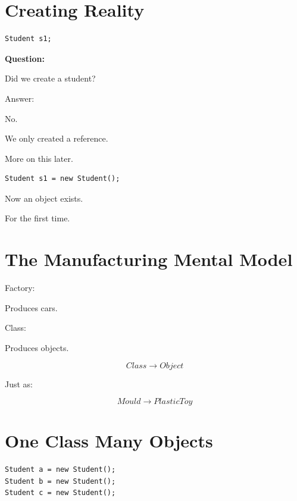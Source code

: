 \documentclass[11pt,a4paper]{book}
\begin{document}

\section{Creating Reality}

\begin{verbatim}
Student s1;
\end{verbatim}

\textbf{Question:}

Did we create a student?

Answer:

No.

We only created a reference.

More on this later.


\begin{verbatim}
Student s1 = new Student();
\end{verbatim}

Now an object exists.

For the first time.


\section{The Manufacturing Mental Model}

\begin{mentalmodel}

Factory:

Produces cars.

Class:

Produces objects.

\end{mentalmodel}

\[
Class
\rightarrow
Object
\]

Just as:

\[
Mould
\rightarrow
Plastic Toy
\]


\section{One Class Many Objects}

\begin{verbatim}
Student a = new Student();
Student b = new Student();
Student c = new Student();
\end{verbatim}
\end{document}
